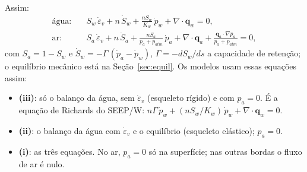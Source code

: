 \documentclass[11pt,a4paper]{article}
\begin{document}
Assim:
\begin{align}
\text{água:}\quad & S_w\,\dot\varepsilon_v + n\,\dot S_w + \frac{n S_w}{K_w}\,\dot p_w + \nabla\!\cdot\mathbf q_w = 0,\\
\text{ar:}\quad & S_a\,\dot\varepsilon_v + n\,\dot S_a + \frac{n S_a}{p_a + p_{atm}}\,\dot p_a + \nabla\!\cdot\mathbf q_a
  + \frac{\mathbf q_a\cdot\nabla p_a}{p_a + p_{atm}} = 0,
\end{align}
com $S_a = 1 - S_w$ e $\dot S_w = -\Gamma\,(\dot p_a - \dot p_w)$, $\Gamma = -dS_w/ds$ a capacidade de retenção; o
equilíbrio mecânico está na Seção~\ref{sec:equil}. Os modelos usam essas equações assim:
\begin{itemize}
  \item \textbf{(iii)}: só o balanço da água, sem $\dot\varepsilon_v$ (esqueleto rígido) e com $p_a = 0$. É a equação de
    Richards do SEEP/W: $n\Gamma\,\dot p_w + (nS_w/K_w)\,\dot p_w + \nabla\!\cdot\mathbf q_w = 0$.
  \item \textbf{(ii)}: o balanço da água com $\dot\varepsilon_v$ e o equilíbrio (esqueleto elástico); $p_a = 0$.
  \item \textbf{(i)}: as três equações. No ar, $p_a = 0$ só na superfície; nas outras bordas o fluxo de ar é nulo.
\end{itemize}
\end{document}
